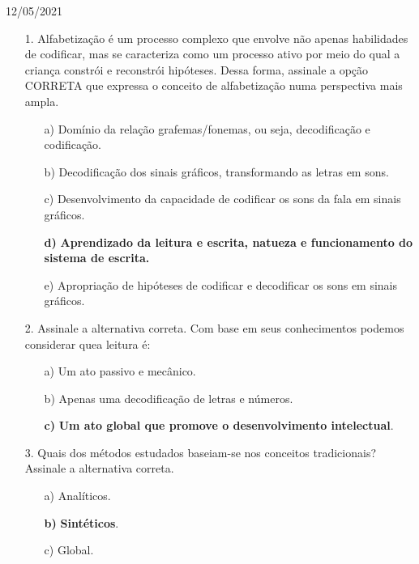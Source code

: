 \documentclass{SchoolBook}
\begin{document}
    \begin{day}{12/05/2021}
        \begin{enumerate}
            \item[1.] Alfabetização é um processo complexo que envolve não apenas habilidades de codificar, mas se caracteriza como um processo ativo por meio do qual a criança constrói e reconstrói hipóteses. Dessa forma, assinale a opção CORRETA que expressa o conceito de alfabetização numa perspectiva mais ampla.
            \begin{enumerate}[nosep]
                \item[a)] Domínio da relação grafemas/fonemas, ou seja, decodificação e codificação.
                \item[b)] Decodificação dos sinais gráficos, transformando as letras em sons.
                \item[c)] Desenvolvimento da capacidade de codificar os sons da fala em sinais gráficos.
                \item[\bf d)] \textbf{Aprendizado da leitura e escrita, natueza e funcionamento do sistema de escrita.}
                \item[e)] Apropriação de hipóteses de codificar e decodificar os sons em sinais gráficos.
            \end{enumerate}
            
            \item[2.] Assinale a alternativa correta. Com base em seus conhecimentos podemos considerar quea leitura é:
            \begin{enumerate}[nosep]
                \item[a)] Um ato passivo e mecânico.
                \item[b)] Apenas uma decodificação de letras e números.
                \item[\bf c)] \textbf{Um ato global que promove o desenvolvimento intelectual}.
            \end{enumerate}
            
            \item[3.] Quais dos métodos estudados baseiam-se nos conceitos tradicionais? Assinale a alternativa correta.
            \begin{enumerate}[nosep]
                \item[a)] Analíticos.
                \item[\bf b)] \textbf{Sintéticos}.
                \item[c)] Global.
            \end{enumerate}
        \end{enumerate}
    \end{day}
\end{document}
